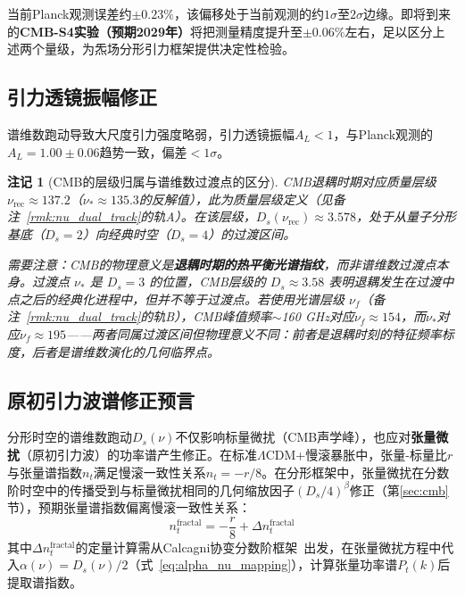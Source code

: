 \documentclass[12pt,a4paper,twocolumn]{article}
\newtheorem{remark}[theorem]{注记}
\begin{document}
当前Planck观测误差约$\pm 0.23\%$，该偏移处于当前观测的约$1\sigma$至$2\sigma$边缘。即将到来的\textbf{CMB-S4实验（预期2029年）}将把测量精度提升至$\pm 0.06\%$左右，足以区分上述两个量级，为炁场分形引力框架提供决定性检验。

\subsection{引力透镜振幅修正}
谱维数跑动导致大尺度引力强度略弱，引力透镜振幅$A_L < 1$，与Planck观测的$A_L = 1.00 \pm 0.06$趋势一致，偏差$<1\sigma$。

\begin{remark}[CMB的层级归属与谱维数过渡点的区分]
\label{rmk:cmb_layer}
CMB退耦时期对应质量层级 $\nu_{\text{rec}} \approx 137.2$（$\nu_* \approx 135.3$的反解值），此为质量层级定义（见备注~\ref{rmk:nu_dual_track}的轨A）。在该层级，$D_s(\nu_{\text{rec}}) \approx 3.578$，处于从量子分形基底（$D_s=2$）向经典时空（$D_s=4$）的过渡区间。

需要注意：CMB的物理意义是\textbf{退耦时期的热平衡光谱指纹}，而非谱维数过渡点本身。过渡点 $\nu_*$ 是 $D_s = 3$ 的位置，CMB层级的 $D_s \approx 3.58$ 表明退耦发生在过渡中点之后的经典化进程中，但并不等于过渡点。若使用光谱层级 $\nu_f$（备注~\ref{rmk:nu_dual_track}的轨B），CMB峰值频率$\sim$160 GHz对应$\nu_f \approx 154$，而$\nu_*$对应$\nu_f \approx 195$——两者同属过渡区间但物理意义不同：前者是退耦时刻的特征频率标度，后者是谱维数演化的几何临界点。
\end{remark}

\subsection{原初引力波谱修正预言}
\label{subsec:tensor_spectral}

分形时空的谱维数跑动$D_s(\nu)$不仅影响标量微扰（CMB声学峰），也应对\textbf{张量微扰}（原初引力波）的功率谱产生修正。在标准$\Lambda$CDM+慢滚暴胀中，张量-标量比$r$与张量谱指数$n_t$满足慢滚一致性关系$n_t = -r/8$。在分形框架中，张量微扰在分数阶时空中的传播受到与标量微扰相同的几何缩放因子$(D_s/4)^\beta$修正（第\ref{sec:cmb}节），预期张量谱指数偏离慢滚一致性关系：
\begin{equation}
n_t^{\text{fractal}} = -\frac{r}{8} + \Delta n_t^{\text{fractal}}
\label{eq:nt_fractal}
\end{equation}
其中$\Delta n_t^{\text{fractal}}$的定量计算需从Calcagni协变分数阶框架~\cite{SalvadorGarcia2026}出发，在张量微扰方程中代入$\alpha(\nu) = D_s(\nu)/2$（式~\ref{eq:alpha_nu_mapping}），计算张量功率谱$P_t(k)$后提取谱指数。
\end{document}
